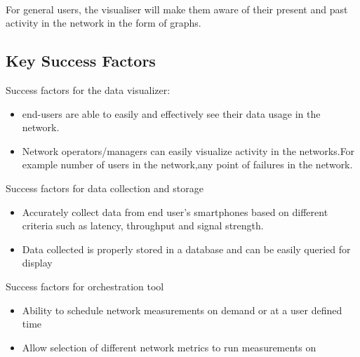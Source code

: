 \paragraph{}
For general users, the visualiser will make them aware of their present and past activity in the network in the form of graphs.
\subsection{Key Success Factors}
Success factors for the data visualizer:
\begin{itemize}
	\item end-users are able to easily and effectively see their data usage in the network.
	\item Network operators/managers can easily visualize activity in the networks.For example number of users in the network,any point of failures in the network. 
\end{itemize}
Success factors for data collection and storage
\begin{itemize}
	\item Accurately collect data from end user's smartphones based on different criteria such as latency, throughput and signal strength.
	\item Data collected is properly stored in a database and can be easily queried for display 
\end{itemize}
Success factors for orchestration tool
\begin{itemize}
	\item Ability to schedule network measurements on demand or at a user defined time
	\item Allow selection of different network metrics to run measurements on  
\end{itemize} 



